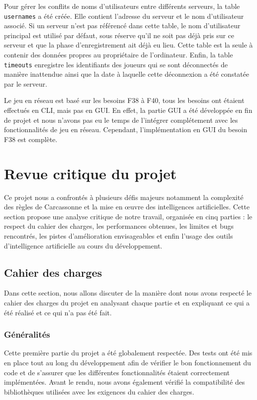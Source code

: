 \documentclass[11pt]{article}
\begin{document}
Pour gérer les conflits de noms d'utilisateurs entre différents serveurs, la table \texttt{usernames} a été créée. Elle contient l'adresse du serveur et le nom d'utilisateur associé. Si un serveur n'est pas référencé dans cette table, le nom 
d'utilisateur principal est utilisé par défaut, sous réserve qu'il 
ne soit pas déjà pris sur ce serveur et que la phase d'enregistrement 
ait déjà eu lieu. Cette table est la seule à contenir des données propres au propriétaire de l'ordinateur. Enfin, la table \texttt{timeouts} enregistre les identifiants des joueurs qui se sont déconnectés de manière inattendue ainsi que la date à laquelle cette déconnexion a été constatée par le serveur.


Le jeu en réseau est basé sur les besoins F38 à F40, tous les besoins ont étaient effectués en CLI, mais pas en GUI.
En effet, la partie GUI a été développée en fin de projet et nous n'avons pas eu le temps de l'intégrer complétement avec les fonctionnalités de jeu en réseau. 
Cependant, l'implémentation en GUI du besoin F38 est complète.
\section{Revue critique du projet}



Ce projet nous a confrontés à plusieurs défis majeurs notamment la 
complexité des règles de Carcassonne et la mise en œuvre des 
intelligences artificielles. Cette section propose une analyse critique 
de notre travail, organisée en cinq parties : le respect du cahier 
des charges, les performances obtenues, les limites et bugs rencontrés, 
les pistes d'amélioration envisageables et enfin l'usage des outils 
d'intelligence artificielle au cours du développement.

\subsection{Cahier des charges}

Dans cette section, nous allons discuter de la manière dont nous avons respecté le cahier des charges du projet en analysant chaque partie et en expliquant ce qui a été réalisé et ce qui n'a pas été fait.

\subsubsection{Généralités}

Cette première partie du projet a été globalement respectée. Des tests 
ont été mis en place tout au long du développement afin de vérifier le 
bon fonctionnement du code et de s'assurer que les différentes 
fonctionnalités étaient correctement implémentées. Avant le rendu, nous 
avons également vérifié la compatibilité des bibliothèques utilisées 
avec les exigences du cahier des charges.
\end{document}

